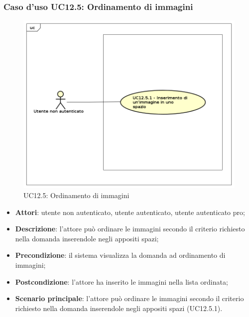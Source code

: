 \subsubsection{Caso d'uso UC12.5: Ordinamento di immagini}
\label{UC12.5}
\begin{figure}[h]
	\centering
	\includegraphics[scale=0.5]{UML/UC12_5.png}
	\caption{UC12.5: Ordinamento di immagini}
\end{figure}
\begin{itemize}
\item \textbf{Attori}: utente non autenticato, utente autenticato, utente autenticato pro;
\item \textbf{Descrizione}: l'attore può ordinare le immagini secondo il criterio richiesto nella domanda inserendole negli appositi spazi;
\item \textbf{Precondizione}: il sistema visualizza la domanda ad ordinamento di immagini;
\item \textbf{Postcondizione}: l'attore ha inserito le immagini nella lista ordinata;
\item \textbf{Scenario principale}: l'attore può ordinare le immagini secondo il criterio richiesto nella domanda inserendole negli appositi spazi (UC12.5.1).
\end{itemize}

\newpage
